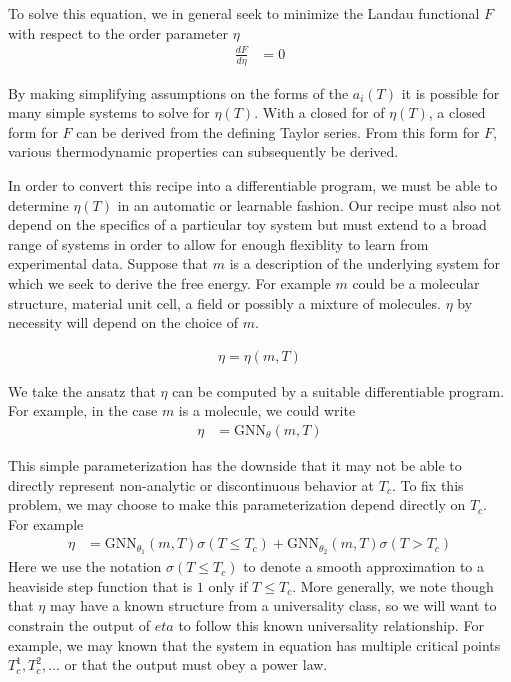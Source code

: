 \documentclass[book.tex]{subfiles}
\begin{document}
To solve this equation, we in general seek to minimize the Landau functional $F$ with respect to the order parameter $\eta$
\begin{align}
\frac{d F}{d \eta} &= 0
\end{align}

By making simplifying assumptions on the forms of the $a_i(T)$ it is possible for many simple systems to solve for $\eta(T)$. With a closed for of $\eta(T)$, a closed form for $F$ can be derived from the defining Taylor series. From this form for $F$, various thermodynamic properties can subsequently be derived.

In order to convert this recipe into a differentiable program, we must be able to determine $\eta(T)$ in an automatic or learnable fashion. Our recipe must also not depend on the specifics of a particular toy system but must extend to a broad range of systems in order to allow for enough flexiblity to learn from experimental data. Suppose that $m$ is a description of the underlying system for which we seek to derive the free energy. For example $m$ could be a molecular structure, material unit cell, a field or possibly a mixture of molecules. $\eta$ by necessity will depend on the choice of $m$. 

\begin{align}
\eta = \eta(m, T)
\end{align}

We take the ansatz that $\eta$ can be computed by a suitable differentiable program. For example, in the case $m$ is a molecule, we could write
\begin{align}
\eta &= \textrm{GNN}_{\theta}(m, T)
\end{align}

This simple parameterization has the downside that it may not be able to directly represent non-analytic or discontinuous behavior at $T_c$. To fix this problem, we may choose to make this parameterization depend directly on $T_c$. For example
\begin{align}
\eta &= \textrm{GNN}_{\theta_1}(m, T)\sigma(T \leq T_c) + \textrm{GNN}_{\theta_2}(m, T)\sigma(T > T_c)
\end{align}
Here we use the notation $\sigma(T \leq T_c)$ to denote a smooth approximation to a heaviside step function that is $1$ only if $T \leq T_c$. More generally, we note though that $\eta$ may have a known structure from a universality class, so we will want to constrain the output of $eta$ to follow this known universality relationship. For example, we may known that the system in equation has multiple critical points $T_c^1,T_c^2,\dotsc$ or that the output must obey a power law.
\end{document}

